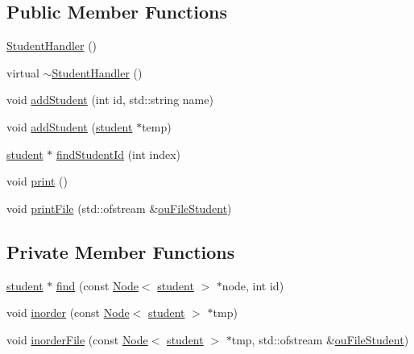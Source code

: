 \subsection*{Public Member Functions}
\begin{DoxyCompactItemize}
\item 
\hyperlink{class_student_handler_a789f9be791a4ada717975e9361f5c967}{Student\+Handler} ()
\item 
virtual \hyperlink{class_student_handler_a1ad6892062e41ea9d5ac1ddf5cdf64c2}{$\sim$\+Student\+Handler} ()
\item 
void \hyperlink{class_student_handler_ae7219f3612d49a8bda1cb14c48557b37}{add\+Student} (int id, std\+::string name)
\item 
void \hyperlink{class_student_handler_a1d0e1f3e8383c38d5c9c5781fb8ce82d}{add\+Student} (\hyperlink{classstudent}{student} $\ast$temp)
\item 
\hyperlink{classstudent}{student} $\ast$ \hyperlink{class_student_handler_ad54072af22b0b84e677af69426ed0bff}{find\+Student\+Id} (int index)
\item 
void \hyperlink{class_student_handler_a08899a7b8ca38541605c564c572d72ef}{print} ()
\item 
void \hyperlink{class_student_handler_a8049bb821d2a0a951600ab79c6ee4e27}{print\+File} (std\+::ofstream \&\hyperlink{_library_mananagement_system_8cpp_a2e073350989a922d101f00447e52dfc6}{ou\+File\+Student})
\end{DoxyCompactItemize}
\subsection*{Private Member Functions}
\begin{DoxyCompactItemize}
\item 
\hyperlink{classstudent}{student} $\ast$ \hyperlink{class_student_handler_a366b1628971d8b8ae437a87978e26e8a}{find} (const \hyperlink{class_node}{Node}$<$ \hyperlink{classstudent}{student} $>$ $\ast$node, int id)
\item 
void \hyperlink{class_student_handler_a9caee269c1ef9b34af2eeb0452a0cabb}{inorder} (const \hyperlink{class_node}{Node}$<$ \hyperlink{classstudent}{student} $>$ $\ast$tmp)
\item 
void \hyperlink{class_student_handler_a61f541e2aa02759a3213a9bceecf125c}{inorder\+File} (const \hyperlink{class_node}{Node}$<$ \hyperlink{classstudent}{student} $>$ $\ast$tmp, std\+::ofstream \&\hyperlink{_library_mananagement_system_8cpp_a2e073350989a922d101f00447e52dfc6}{ou\+File\+Student})
\end{DoxyCompactItemize}
